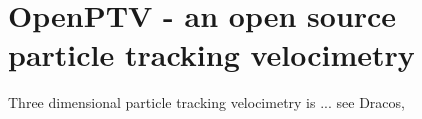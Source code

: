 \section{OpenPTV - an open source particle tracking velocimetry} 

Three dimensional particle tracking velocimetry is ... see Dracos, \cite{1996}
  